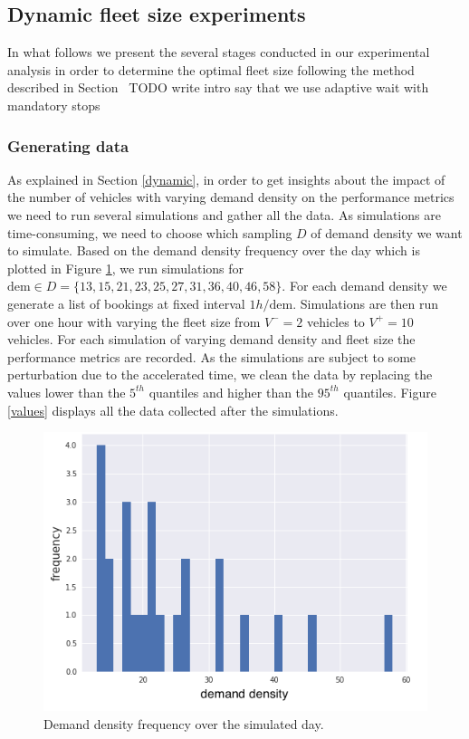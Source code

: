 \documentclass[12pt,a4paper]{article}
\begin{document}
\subsection{Dynamic fleet size experiments}\label{dynamicexperiments}
In what follows we present the several stages conducted in our experimental analysis in order to determine the optimal fleet size following the method described in Section \
 TODO write intro 
say that we use adaptive wait with mandatory stops

\subsubsection{Generating data}\label{data}
As explained in Section \ref{dynamic}, in order to get insights about the impact of the number of vehicles with varying demand density on the performance metrics we need to run several simulations and gather all the data. As simulations are time-consuming, we need to choose which sampling $D$ of demand density we want to simulate. Based on the demand density frequency over the day which is plotted in Figure \ref{demfreq}, we run simulations for $\text{dem} \in D = \{13, 15, 21, 23, 25, 27, 31, 36, 40, 46, 58\}$. For each demand density we generate a list of bookings at fixed interval $1h / \text{dem}$. Simulations are then run over one hour with varying the fleet size from $V^{-}=2$ vehicles to $V^{+}=10$ vehicles. For each simulation of varying demand density and fleet size the performance metrics are recorded. As the simulations are subject to some perturbation due to the accelerated time, we clean the data by replacing the values lower than the $5^{th}$ quantiles and higher than the $95^{th}$ quantiles. Figure \ref{values} displays all the data collected after the simulations.

\begin{figure} 
  \centering

\includegraphics[scale=0.6]{./images/demand_freq.png}
  \caption{Demand density frequency over the simulated day.}
\label{demfreq}
\end{figure}
\end{document}
